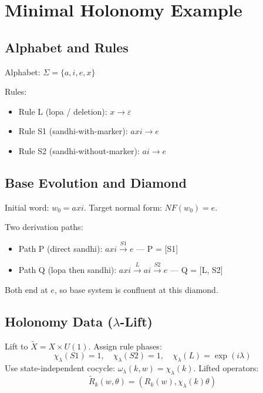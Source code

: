\documentclass[12pt, oneside]{article}
\begin{document}
\section{Minimal Holonomy Example}

\subsection{Alphabet and Rules}

Alphabet: $\Sigma = \{a, i, e, x\}$

Rules:
\begin{itemize}
    \item Rule L (lopa / deletion): $x \to \varepsilon$
    \item Rule S1 (sandhi-with-marker): $a x i \to e$
    \item Rule S2 (sandhi-without-marker): $a i \to e$
\end{itemize}

\subsection{Base Evolution and Diamond}

Initial word: $w_0 = axi$. Target normal form: $NF(w_0) = e$.

Two derivation paths:
\begin{itemize}
    \item Path P (direct sandhi): $axi \xrightarrow{S1} e$ — P = [S1]
    \item Path Q (lopa then sandhi): $axi \xrightarrow{L} ai \xrightarrow{S2} e$ — Q = [L, S2]
\end{itemize}
Both end at $e$, so base system is confluent at this diamond.

\subsection{Holonomy Data ($\lambda$-Lift)}

Lift to $\widetilde{X} = X \times U(1)$. Assign rule phases:
\begin{equation}
\chi_\lambda(S1) = 1, \quad \chi_\lambda(S2) = 1, \quad \chi_\lambda(L) = \exp(i\lambda)
\end{equation}
Use state-independent cocycle: $\omega_\lambda(k,w) = \chi_\lambda(k)$. Lifted operators:
\begin{equation}
\widetilde{R}_k(w,\theta) = (R_k(w), \chi_\lambda(k)\theta)
\end{equation}
\end{document}
